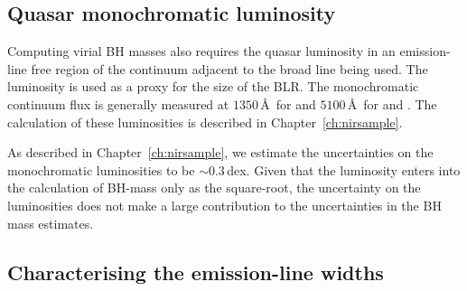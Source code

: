 \subsection{Quasar monochromatic luminosity}

Computing virial BH masses also requires the quasar luminosity in an emission-line free region of the continuum adjacent to the broad line being used. 
The luminosity is used as a proxy for the size of the BLR. 
The monochromatic continuum flux is generally measured at $1350$\,\AA\ for  and $5100$\,\AA\, for \ha and \hbns. 
The calculation of these luminosities is described in Chapter~\ref{ch:nirsample}. 

As described in Chapter~\ref{ch:nirsample}, we estimate the uncertainties on the monochromatic luminosities to be $\sim0.3$\,dex. 
Given that the luminosity enters into the calculation of BH-mass only as the square-root, the uncertainty on the luminosities does not make a large contribution to the uncertainties in the BH mass estimates.  

\subsection{Characterising the emission-line widths}
\label{sub:charemprof}

